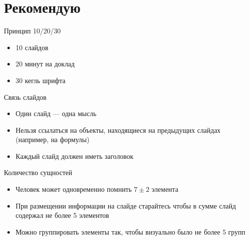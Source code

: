 \documentclass[
  ignorenonframetext,
  aspectratio=169,
  russian,
]{beamer}
\providecommand{\tightlist}{%
  \setlength{\itemsep}{0pt}\setlength{\parskip}{0pt}}
\begin{document}
\section{Рекомендую}\label{ux440ux435ux43aux43eux43cux435ux43dux434ux443ux44e}

\begin{frame}{Принцип 10/20/30}
\label{ux43fux440ux438ux43dux446ux438ux43f-102030}
\begin{itemize}[<+->]
\tightlist
\item
  10 слайдов
\item
  20 минут на доклад
\item
  30 кегль шрифта
\end{itemize}
\end{frame}

\begin{frame}{Связь слайдов}
\label{ux441ux432ux44fux437ux44c-ux441ux43bux430ux439ux434ux43eux432}
\begin{itemize}[<+->]
\tightlist
\item
  Один слайд --- одна мысль
\item
  Нельзя ссылаться на объекты, находящиеся на предыдущих слайдах
  (например, на формулы)
\item
  Каждый слайд должен иметь заголовок
\end{itemize}
\end{frame}

\begin{frame}{Количество сущностей}
\label{ux43aux43eux43bux438ux447ux435ux441ux442ux432ux43e-ux441ux443ux449ux43dux43eux441ux442ux435ux439}
\begin{itemize}[<+->]
\tightlist
\item
  Человек может одновременно помнить \(7 \pm 2\) элемента
\item
  При размещении информации на слайде старайтесь чтобы в сумме слайд
  содержал не более 5 элементов
\item
  Можно группировать элементы так, чтобы визуально было не более 5 групп
\end{itemize}
\end{frame}
\end{document}
